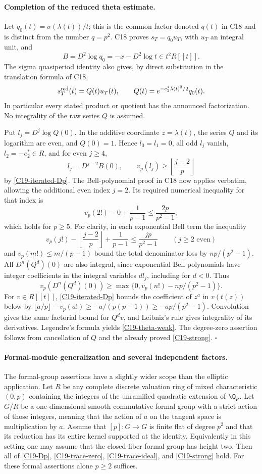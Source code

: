 \paragraph{Completion of the reduced theta estimate.}
Let $q_0(t)=\sigma(\lambda(t))/t$; this is the common factor
denoted $q(t)$ in C18 and is distinct from the number $q=p^2$.
C18 proves $s_T=q_0u_T$, with $u_T$ an integral unit, and
\[
 B=D^2\log q_0=-x-D^2\log t\in t^2R[[t]].
\]
The sigma quasiperiod identity also gives, by direct substitution
in the translation formula of C18,
\[
 s_T^{\rm red}(t)=Q(t)u_T(t),\qquad
 Q(t)=e^{-e_2^*\lambda(t)^2/2}q_0(t).
\]
In particular every stated product or quotient has the announced
factorization.  No integrality of the raw series $Q$ is assumed.

Put $l_j=D^j\log Q(0)$.  In the additive coordinate
$z=\lambda(t)$, the series $Q$ and its logarithm are even,
and $Q(0)=1$.  Hence $l_0=l_1=0$, all odd $l_j$ vanish,
$l_2=-e_2^*\in R$, and for even $j\geq4$,
\[
 l_j=D^{j-2}B(0),\qquad
 v_p(l_j)\geq\left\lfloor\frac{j-2}{p}\right\rfloor
\]
by \eqref{C19-iterated-Dp}.
The Bell-polynomial proof in C18 now applies verbatim, allowing
the additional even index $j=2$.  Its required numerical
inequality for that index is
\[
 v_p(2!)-0+\frac1{p-1}
       \leq\frac{2p}{p^2-1},
\]
which holds for $p\geq5$.  For clarity, in each exponential
Bell term the inequality
\[
 v_p(j!)-\left\lfloor\frac{j-2}{p}\right\rfloor
       +\frac1{p-1}\leq\frac{jp}{p^2-1}
       \qquad(j\geq2\text{ even})
\]
and $v_p(m!)\leq m/(p-1)$ bound the total denominator loss
by $np/(p^2-1)$.  All $D^n(Q^d)(0)$ are also integral,
since exponential Bell polynomials have integer coefficients
in the integral variables $d l_j$, including for $d<0$.
Thus
\[
 v_p(D^n(Q^d)(0))
       \geq\max\{0,v_p(n!)-np/(p^2-1)\}.
\]
For $v\in R[[t]]$, \eqref{C19-iterated-Dp} bounds the
coefficient of $z^a$ in $v(t(z))$ below by
$\lfloor a/p\rfloor-v_p(a!)\geq-a/(p(p-1))
\geq-ap/(p^2-1)$.
Convolution gives the same factorial bound for $Q^dv$,
and Leibniz's rule gives integrality of its derivatives.
Legendre's formula yields \eqref{C19-theta-weak}.
The degree-zero assertion follows from cancellation of $Q$
and the already proved \eqref{C19-strong}.
\hfill$\square$

\paragraph{Formal-module generalization and several independent factors.}
The formal-group assertions have a slightly wider scope than
the elliptic application.  Let $R$ be any complete discrete
valuation ring of mixed characteristic $(0,p)$ containing
the integers of the unramified quadratic extension of $\Q_p$.
Let $G/R$ be a one-dimensional smooth commutative formal group
with a strict action of those integers, meaning that the action
of $a$ on the tangent space is multiplication by $a$.
Assume that $[p]:G\to G$ is finite flat of degree $p^2$ and
that its reduction has its entire kernel supported at the
identity.  Equivalently in this setting one may assume that
the closed-fiber formal group has height two.
Then all of \eqref{C19-Dp}, \eqref{C19-trace-zero},
\eqref{C19-trace-ideal}, and \eqref{C19-strong} hold.
For these formal assertions alone $p\geq2$ suffices.

